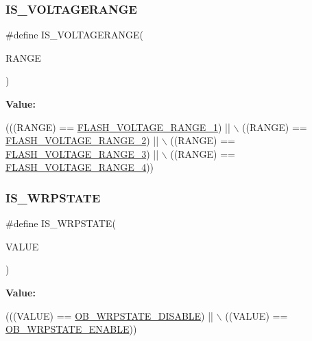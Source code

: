 \subsubsection{\texorpdfstring{I\+S\+\_\+\+V\+O\+L\+T\+A\+G\+E\+R\+A\+N\+GE}{IS\_VOLTAGERANGE}}
{\footnotesize\ttfamily \#define I\+S\+\_\+\+V\+O\+L\+T\+A\+G\+E\+R\+A\+N\+GE(\begin{DoxyParamCaption}\item[{}]{R\+A\+N\+GE }\end{DoxyParamCaption})}

{\bfseries Value\+:}
\begin{DoxyCode}
(((RANGE) == \mbox{\hyperlink{group___f_l_a_s_h_ex___voltage___range_ga5cadf49a63c968cde3b980e5139d398e}{FLASH\_VOLTAGE\_RANGE\_1}}) || \(\backslash\)
                               ((RANGE) == \mbox{\hyperlink{group___f_l_a_s_h_ex___voltage___range_gad047be2bc7aa9be946b5b0c6b3062ef3}{FLASH\_VOLTAGE\_RANGE\_2}}) || \(\backslash\)
                               ((RANGE) == \mbox{\hyperlink{group___f_l_a_s_h_ex___voltage___range_ga50950407a789684eec9216f49e0831a0}{FLASH\_VOLTAGE\_RANGE\_3}}) || \(\backslash\)
                               ((RANGE) == \mbox{\hyperlink{group___f_l_a_s_h_ex___voltage___range_gabf8037a482f18815c5a67f287223a658}{FLASH\_VOLTAGE\_RANGE\_4}}))
\end{DoxyCode}
\mbox{\label{group___f_l_a_s_h_ex___i_s___f_l_a_s_h___definitions_ga8164622401a6cacf006679166de93c21}} 
\subsubsection{\texorpdfstring{I\+S\+\_\+\+W\+R\+P\+S\+T\+A\+TE}{IS\_WRPSTATE}}
{\footnotesize\ttfamily \#define I\+S\+\_\+\+W\+R\+P\+S\+T\+A\+TE(\begin{DoxyParamCaption}\item[{}]{V\+A\+L\+UE }\end{DoxyParamCaption})}

{\bfseries Value\+:}
\begin{DoxyCode}
(((VALUE) == \mbox{\hyperlink{group___f_l_a_s_h_ex___w_r_p___state_gaa34eb6205fe554f65a311ee974d5a4ab}{OB\_WRPSTATE\_DISABLE}}) || \(\backslash\)
                           ((VALUE) == \mbox{\hyperlink{group___f_l_a_s_h_ex___w_r_p___state_ga9fc463145ab57616baa36d95523186a1}{OB\_WRPSTATE\_ENABLE}}))
\end{DoxyCode}
